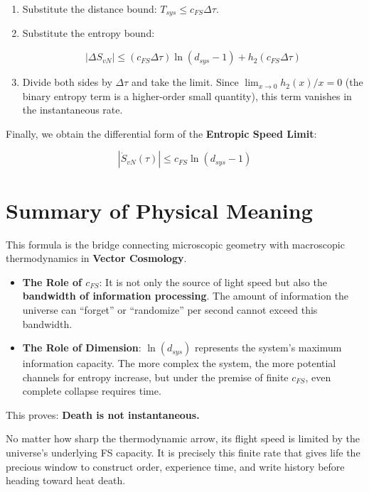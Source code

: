 \begin{enumerate}
\item Substitute the distance bound: $T_{sys} \le c_{FS} \Delta\tau$.

\item Substitute the entropy bound:

    \[|\Delta S_{vN}| \le (c_{FS} \Delta\tau) \ln(d_{sys}-1) + h_2(c_{FS} \Delta\tau)\]

\item Divide both sides by $\Delta\tau$ and take the limit. Since $\lim_{x\to 0} h_2(x)/x = 0$ (the binary entropy term is a higher-order small quantity), this term vanishes in the instantaneous rate.
\end{enumerate}

Finally, we obtain the differential form of the \textbf{Entropic Speed Limit}:

\[|\dot{S}_{vN}(\tau)| \le c_{FS} \ln(d_{sys}-1)\]

\section{Summary of Physical Meaning}

This formula is the bridge connecting microscopic geometry with macroscopic thermodynamics in \textbf{Vector Cosmology}.

\begin{itemize}
\item \textbf{The Role of $c_{FS}$}: It is not only the source of light speed but also the \textbf{bandwidth of information processing}. The amount of information the universe can ``forget'' or ``randomize'' per second cannot exceed this bandwidth.

\item \textbf{The Role of Dimension}: $\ln(d_{sys})$ represents the system's maximum information capacity. The more complex the system, the more potential channels for entropy increase, but under the premise of finite $c_{FS}$, even complete collapse requires time.
\end{itemize}

This proves: \textbf{Death is not instantaneous.}

No matter how sharp the thermodynamic arrow, its flight speed is limited by the universe's underlying FS capacity. It is precisely this finite rate that gives life the precious window to construct order, experience time, and write history before heading toward heat death.


